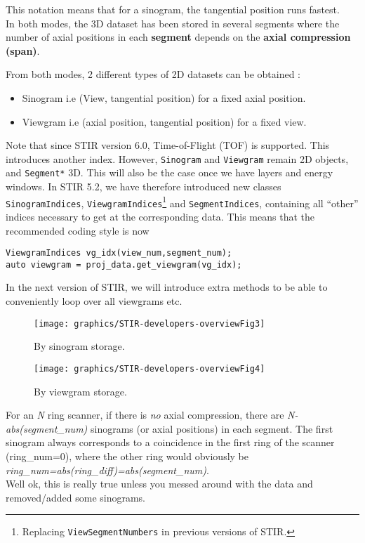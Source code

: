 \documentclass{article}
\begin{document}
This notation means that for a sinogram, the tangential position 
runs fastest.\\
In both modes, the 3D dataset has been stored in several segments 
where the number of axial positions in each \textbf{segment} depends 
on the \textbf{axial compression (span)}.


From both modes, 2 different types of 2D datasets can be obtained 
:
\begin{itemize}
\item Sinogram i.e (View, tangential position) for a fixed axial 
position.
\item Viewgram i.e (axial position, tangential position) for a fixed 
view.
\end{itemize} 

Note that since STIR version 6.0, Time-of-Flight (TOF) is supported. This introduces another
index. However, \texttt{Sinogram} and \texttt{Viewgram} remain 2D objects, and \texttt{Segment*} 3D.
This will also be the case once we have layers and energy windows.
In STIR 5.2, we have therefore introduced new classes
\texttt{SinogramIndices}, \texttt{ViewgramIndices}\footnote{Replacing \texttt{ViewSegmentNumbers} in previous versions of STIR.}
and \texttt{SegmentIndices}, containing all ``other''
indices necessary to get at the corresponding data. This means that the recommended coding style is now
\begin{verbatim}
ViewgramIndices vg_idx(view_num,segment_num);
auto viewgram = proj_data.get_viewgram(vg_idx);
\end{verbatim}
In the next version of STIR, we will introduce extra methods to be able to conveniently loop over all viewgrams etc.

\begin{figure}[htbp]
\begin{center}
\texttt{[image: graphics/STIR-developers-overviewFig3]}
\caption{By sinogram storage.}
\label{fig:sinogramstorage}
\end{center}
\end{figure}

\begin{figure}[htbp]
\begin{center}
\texttt{[image: graphics/STIR-developers-overviewFig4]}
\caption{By viewgram storage.}
\label{fig:viewgramstorage}
\end{center}
\end{figure}


For an \textit{N} ring scanner, if there is \textit{no} axial compression, 
there are \textit{N-abs(segment\_num)}  sinograms (or axial positions) 
in each segment. The first sinogram always corresponds to a coincidence 
in the first ring of the scanner (ring\_num=0), where the other 
ring would obviously be \textit{ring\_num=abs(ring\_diff)=abs(segment\_num)}. 
\\
Well ok, this is really true unless you messed around with the 
data and removed/added some sinograms. 
\end{document}
